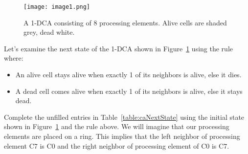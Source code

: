 \begin{figure}[ht]
\texttt{[image: image1.png]}
\caption{A 1-DCA consisting of 8 processing elements. Alive cells are
shaded grey, dead white.}
\label{fig:exampleCA}
\end{figure}

Let's examine the next state of the 1-DCA shown in Figure~\ref{fig:exampleCA} 
using the rule where:

\begin{itemize}
\item
  An alive cell stays alive when exactly 1 of its neighbors is alive,
  else it dies.
\item
  A dead cell comes alive when exactly 1 of its neighbors is alive, else
  it stays dead.
\end{itemize}

Complete the unfilled entries in Table~\ref{table:caNextState} using the initial state shown
in Figure~\ref{fig:exampleCA} and the rule above. We will imagine that our processing
elements are placed on a ring. This implies that the left neighbor of
processing element C7 is C0 and the right neighbor of processing element
of C0 is C7.

